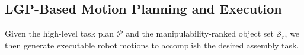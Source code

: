 \documentclass[letterpaper, 10 pt, conference]{ieeeconf}  %
\begin{document}

\subsection{LGP-Based Motion Planning and Execution}
\label{sec:motion_execution}

Given the high-level task plan $\mathcal{P}$ and the manipulability-ranked object set $\hat{\mathcal{S}}_r$, we then generate executable robot motions to accomplish the desired assembly task. 


\end{document}
